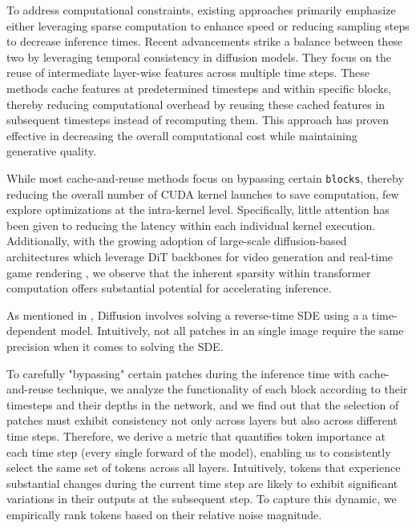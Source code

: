\documentclass[10pt]{article}
\begin{document}
To address computational constraints, existing approaches primarily emphasize either leveraging sparse computation \citep{NEURIPS2022_b9603de9,wang2024sparsedmsparseefficientdiffusion} to enhance speed or reducing sampling steps \citep{lu2024simplifyingstabilizingscalingcontinuoustime,song2023consistency,liu2024instaflowstephighqualitydiffusionbased} to decrease inference times. Recent advancements \citep{ma2023deepcache,ma2024learningtocache} strike a balance between these two by leveraging temporal consistency in diffusion models. They focus on the reuse of intermediate layer-wise features across multiple time steps. These methods cache features at predetermined timesteps and within specific blocks, thereby reducing computational overhead by reusing these cached features in subsequent timesteps instead of recomputing them. This approach has proven effective in decreasing the overall computational cost while maintaining generative quality.

While most cache-and-reuse methods focus on bypassing certain \texttt{blocks}, thereby reducing the overall number of CUDA kernel launches to save computation, few explore optimizations at the intra-kernel level. Specifically, little attention has been given to reducing the latency within each individual kernel execution. Additionally, with the growing adoption of large-scale diffusion-based architectures which leverage DiT \citep{Peebles2022DiT} backbones for video generation \citep{liu2024mardinimaskedautoregressivediffusion,videoworldsimulators2024} and real-time game rendering \citep{chen2024diffusionforcingnexttokenprediction,oasis2024}, we observe that the inherent sparsity within transformer computation offers substantial potential for accelerating inference.

As mentioned in \citep{song2021scorebasedgenerativemodelingstochastic,NEURIPS2019_3001ef25}, Diffusion involves solving a reverse-time SDE using a a time-dependent model. Intuitively, not all patches in an single image require the same precision when it comes to solving the SDE. 

To carefully "bypassing" certain patches during the inference time with cache-and-reuse technique, we analyze the functionality of each block according to their timesteps and their depths in the network, and we find out that the selection of patches must exhibit consistency not only across layers but also across different time steps. Therefore, we derive a metric that quantifies token importance at each time step (every single forward of the model), enabling us to consistently select the same set of tokens across all layers. Intuitively, tokens that experience substantial changes during the current time step are likely to exhibit significant variations in their outputs at the subsequent step. To capture this dynamic, we empirically rank tokens based on their relative noise magnitude. 
\end{document}
